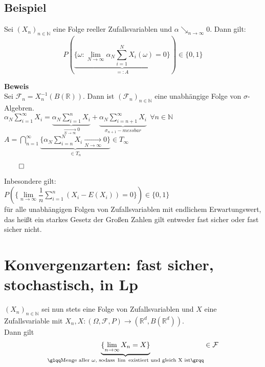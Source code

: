 \documentclass[german,10pt,oneside, fleqn, a4paper]{article}
\newcommand {\R}	{\mathbb{R}}
\newcommand {\N}	{\mathbb{N}}
\newcommand{\brc}[1]{\left(#1\right)}
\newcommand{\QED}{\begin{flushright}$\qed$\end{flushright}}
\newcommand{\mc}[1]{\mathcal{#1}}
\newcommand{\1}[1]{1_{#1}}
\newcommand{\2}[1]{\1{\brac{#1}}}
\newcommand{\raum}{\brc{\Omega,\mc{F},P}}
\newcommand{\f}{\mc{F}}
\begin{document}
\subsection{Beispiel}
Sei $\left(X_n\right)_{n\in\N}$ eine Folge reeller Zufallsvariablen und $\alpha \searrow_{n\rightarrow\infty}0$. Dann gilt:
\[ P\left(\underbrace{\lbrace\omega:\lim\limits_{N\rightarrow\infty} \alpha_N\sum\limits_{i=1}^NX_i\left(\omega\right)=0\rbrace}_{=:A}\right)\in\lbrace 0,1 \rbrace\]

\textbf{Beweis}\\
Sei $\f_n=X_n^{-1}(B(\R))$. Dann ist $(\f_n)_{n\in\N}$ eine unabhängige Folge von $\sigma$-Algebren.\\
$\alpha_N\sum\limits_{i=1}^\infty X_i=\underbrace{{\alpha_N}\sum\limits_{i=1}^n X_i}_{\xrightarrow[N\rightarrow\infty]{}0}+\underbrace{{\alpha_N}\sum\limits_{i=n+1}^\infty X_i}_{\sigma_{n+1}-messbar}\ \ \forall n\in\N$\\
$A=\bigcap\limits_{n=1}^\infty\underbrace{\lbrace\alpha_N\sum\limits_{i=n}^NX_i\xrightarrow[N\rightarrow\infty]{}0\rbrace}_{\in T_n}\in T_\infty$\QED
Inbesondere gilt:\\
$P(\lbrace\lim\limits_{n\rightarrow\infty}\dfrac{1}{n}\sum\limits_{i=1}^n(X_i-E(X_i))=0\rbrace)\in\lbrace 0,1\rbrace$\\
für alle unabhängigen Folgen von Zufallsvariablen mit endlichem Erwartungswert, das heißt ein starkes Gesetz der Großen Zahlen gilt entweder fast sicher oder \glqq fast sicher nicht\grqq . 





\pagebreak

\section{Konvergenzarten: fast sicher, stochastisch, in Lp}
$\left(X_n\right)_{n\in\N}$ sei nun stets eine Folge von Zufallsvariablen und $X$ eine Zufallsvariable mit $X_n, X:\raum\rightarrow\left(\R^d,B\left(\R^d\right)\right)$.\\
Dann gilt \[\underbrace{\lbrace\lim\limits_{n\rightarrow\infty}X_n=X\rbrace}_{\glqq \text{Menge aller }\omega\text{, sodass }\lim\text{ existiert und gleich X ist}\grqq}\in\f\]
\end{document}
